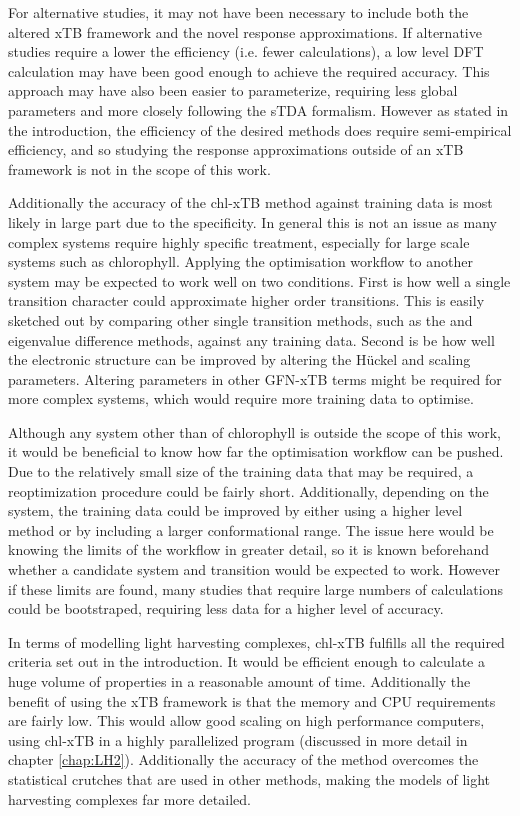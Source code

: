 For alternative studies, it may not have been necessary to include both the altered 
xTB framework and the novel response approximations. If alternative studies require
a lower the efficiency (i.e. fewer calculations), a low level DFT calculation may 
have been good enough to achieve the required accuracy. This approach may have also
been easier to parameterize, requiring less global parameters and more closely following
the sTDA formalism. However as stated in the introduction, the efficiency of the 
desired methods does require semi-empirical efficiency, and so studying the response
approximations outside of an xTB framework is not in the scope of this work.

Additionally the accuracy of the chl-xTB method against training data is most likely
in large part due to the specificity. In general this is not an issue as many complex
systems require highly specific treatment, especially for large scale systems such
as chlorophyll. Applying the optimisation workflow to another system may be expected
to work well on two conditions. First is how well a single transition character
could approximate higher order transitions. This is easily sketched out by comparing
other single transition methods, such as the \dscf and eigenvalue difference methods,
against any training data. Second is be how well the electronic structure can be 
improved by altering the H{\"u}ckel and scaling parameters. Altering parameters
in other GFN-xTB terms might be required for more complex systems, which would require
more training data to optimise.

Although any system other than of chlorophyll is outside the scope of this work, 
it would be beneficial to know how far the optimisation workflow can be pushed. Due
to the relatively small size of the training data that may be required, a reoptimization
procedure could be fairly short. Additionally, depending on the system, the training
data could be improved by either using a higher level method or by including a larger
conformational range. The issue here would be knowing the limits of the workflow
in greater detail, so it is known beforehand whether a candidate system and transition
would be expected to work. However if these limits are found, many studies that 
require large numbers of calculations could be bootstraped, requiring less data 
for a higher level of accuracy.

In terms of modelling light harvesting complexes, chl-xTB fulfills all the required
criteria set out in the introduction. It would be efficient enough to calculate
a huge volume of properties in a reasonable amount of time. Additionally the benefit
of using the xTB framework is that the memory and CPU requirements are fairly low.
This would allow good scaling on high performance computers, using chl-xTB in a 
highly parallelized program (discussed in more detail in chapter \ref{chap:LH2}).
Additionally the accuracy of the method overcomes the statistical crutches that
are used in other methods, making the models of light harvesting complexes far more
detailed.

